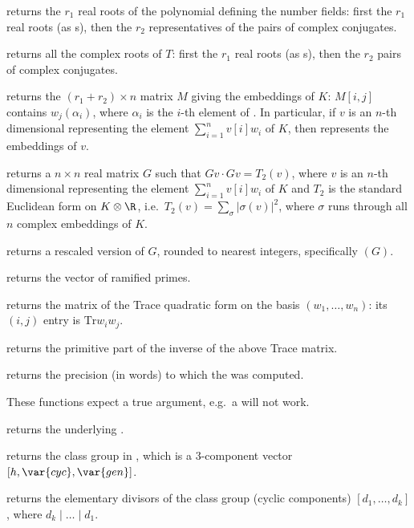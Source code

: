  returns the $r_1$ real roots of the polynomial
defining the number fields: first the $r_1$ real roots (as s), then
the $r_2$ representatives of the pairs of complex conjugates.

 returns all the complex roots of $T$:
first the $r_1$ real roots (as s), then the $r_2$ pairs of complex
conjugates.

 returns the $(r_1+r_2)\times n$ matrix $M$
giving the embeddings of $K$: $M[i,j]$ contains $w_j(\alpha_i)$, where
$\alpha_i$ is the $i$-th element of . In particular,
if $v$ is an $n$-th dimensional  representing the element
$\sum_{i=1}^n v[i] w_i$ of $K$, then  represents the
embeddings of $v$.

 returns a $n\times n$ real matrix $G$ such that
$Gv \cdot Gv = T_2(v)$, where $v$ is an $n$-th dimensional 
representing the element $\sum_{i=1}^n v[i] w_i$ of $K$ and $T_2$ is the
standard Euclidean form on $K\otimes \R$, i.e.~$T_2(v)
= \sum_{\sigma} |\sigma(v)|^2$, where $\sigma$ runs through all $n$ complex
embeddings of $K$.

 returns a rescaled version of $G$, rounded
to nearest integers, specifically $(G)$.

 returns the vector of ramified
primes.

 returns the matrix of the Trace quadratic form
on the basis $(w_1,\ldots,w_n)$: its $(i,j)$ entry is $\text{Tr} w_i w_j$.

 returns the primitive part of the inverse of
the above Trace matrix.

 returns the precision (in words) to which the
 was computed.


These functions expect a true  argument, e.g.~a  will not
work.

 returns the underlying .

 returns the class group in ,
which is a $3$-component vector $[h, \var{cyc}, \var{gen}]$.

 returns the elementary divisors
of the class group (cyclic components) $[d_1,\ldots, d_k]$, where
$d_k \mid \ldots \mid d_1$.

